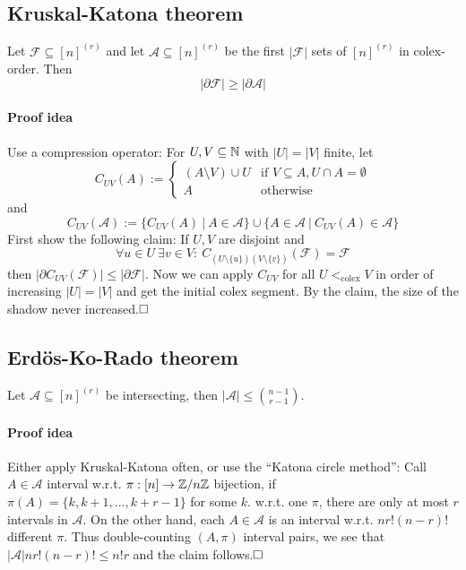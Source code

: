 \subsection{Kruskal-Katona theorem}
Let $\mathcal{F} \subseteq [n]^{(r)}$ and let $\mathcal{A} \subseteq [n]^{(r)}$ be the first $|\mathcal{F}|$ sets of $[n]^{(r)}$ in colex-order. Then
\begin{equation*}
    |\partial\mathcal{F}| \geq |\partial\mathcal{A}|
\end{equation*}
\paragraph{Proof idea} Use a compression operator: For $U, V \subseteq \mathbb{N}$ with $|U| = |V|$ finite, let
\begin{equation*}
    C_{UV}(A) := \begin{cases}
        (A \setminus V) \cup U & \text{if $V \subseteq A, U \cap A = \emptyset$} \\
        A & \text{otherwise}
    \end{cases}
\end{equation*}
and
\begin{equation*}
    C_{UV}(\mathcal{A}) := \{ C_{UV}(A) \ | \ A \in \mathcal{A} \} \cup \{ A \in \mathcal{A} \ | \ C_{UV}(A) \in \mathcal{A} \}
\end{equation*}
First show the following claim:
If $U, V$ are disjoint and
\begin{equation*}
    \forall u \in U \ \exists v \in V: \ C_{(U \setminus \{u\})(V \setminus \{v\})}(\mathcal{F}) = \mathcal{F}
\end{equation*}
then $|\partial C_{UV}(\mathcal{F})| \leq |\partial\mathcal{F}|$.
Now we can apply $C_{UV}$ for all $U <_{\mathrm{colex}} V$ in order of increasing $|U| = |V|$ and get the initial colex segment.
By the claim, the size of the shadow never increased.$\hfill\square$

\subsection{Erdös-Ko-Rado theorem}
Let $\mathcal{A} \subseteq [n]^{(r)}$ be intersecting, then $|\mathcal{A}| \leq {n - 1 \choose r - 1}$.
\paragraph{Proof idea} Either apply Kruskal-Katona often, or use the ``Katona circle method'':
Call $A \in \mathcal{A}$ interval w.r.t. $\pi: [n] \to \mathbb{Z}/n\mathbb{Z}$ bijection, if $\pi(A) = \{ k, k + 1, ..., k + r - 1 \}$ for some $k$.
w.r.t. one $\pi$, there are only at most $r$ intervals in $\mathcal{A}$.
On the other hand, each $A \in \mathcal{A}$ is an interval w.r.t. $nr!(n - r)!$ different $\pi$.
Thus double-counting $(A, \pi)$ interval pairs, we see that $|\mathcal{A}|nr!(n - r)! \leq n!r$ and the claim follows.$\hfill\square$

